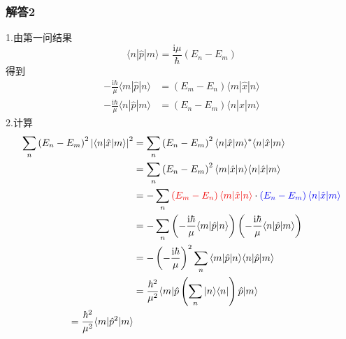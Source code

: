 \subsubsection{解答2}
1.由第一问结果
\begin{equation}
    \langle n|\hat{p}|m\rangle =\frac{\mathrm{i}\mu}{\hbar}\left( E_n-E_m \right) 
\end{equation}
得到
\begin{equation}
    \begin{aligned}
        -\frac{\mathrm{i}\hbar}{\mu}\langle m|\hat{p}|n\rangle &=\left( E_m-E_n \right) \langle m|\hat{x}|n\rangle 
\\
-\frac{\mathrm{i}\hbar}{\mu}\langle n|\hat{p}|m\rangle &=\left( E_n-E_m \right) \langle n|\hat{x}|m\rangle 
    \end{aligned}
\end{equation}
2.计算
\begin{equation}
    \begin{aligned}
        \sum_n{\left( E_n-E_m \right) ^2}\left| \langle n|\hat{x}|m\rangle \right|^2&=\sum_n{\left( E_n-E_m \right) ^2\langle n|\hat{x}|m\rangle ^*\langle n|\hat{x}|m\rangle}
\\
&=\sum_n{\left( E_n-E_m \right) ^2\langle m|\hat{x}|n\rangle \langle n|\hat{x}|m\rangle}
\\
&=-\sum_n{{\color[RGB]{240, 0, 0} \left( E_m-E_n \right) \langle m|\hat{x}|n\rangle }\cdot {\color[RGB]{0, 0, 240} \left( E_n-E_m \right) \langle n|\hat{x}|m\rangle }}
\\
&=-\sum_n{\left( -\frac{\mathrm{i}\hbar}{\mu}\langle m|\hat{p}|n\rangle \right) \left( -\frac{\mathrm{i}\hbar}{\mu}\langle n|\hat{p}|m\rangle \right)}
\\
&=-\left( -\frac{\mathrm{i}\hbar}{\mu} \right) ^2\sum_n{\langle m|\hat{p}|n\rangle \langle n|\hat{p}|m\rangle}
\\
&=\frac{\hbar ^2}{\mu ^2}\langle m|\hat{p}\left( \sum_n{|n\rangle \langle n|} \right) \hat{p}|m\rangle 
\\
=\frac{\hbar ^2}{\mu ^2}\langle m|\hat{p}^2|m\rangle 
    \end{aligned}
\end{equation}


